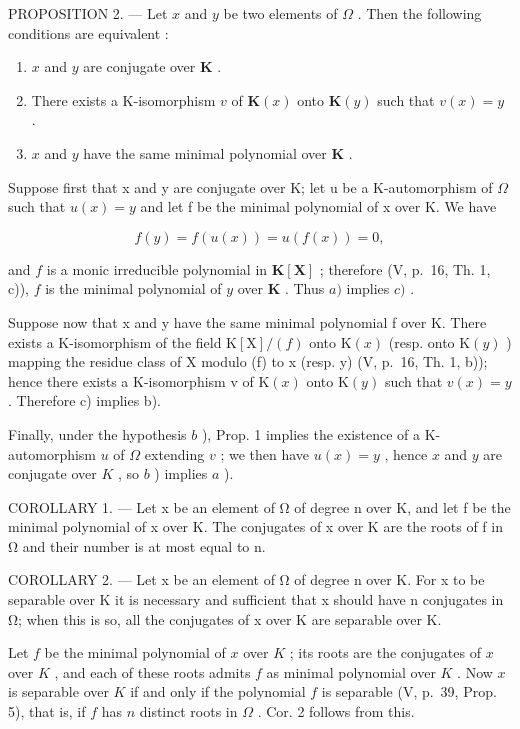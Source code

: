 PROPOSITION 2. --- Let \(x\) and \(y\) be two elements of \(\Omega\) . Then the following conditions are equivalent :

\begin{enumerate}
\def\labelenumi{\alph{enumi})}
\item
  \(x\) and \(y\) are conjugate over \(\mathbf{K}\) .
\item
  There exists a K-isomorphism \(v\) of \(\mathbf{K}(x)\) onto \(\mathbf{K}(y)\) such that \(v(x) = y\) .
\item
  \(x\) and \(y\) have the same minimal polynomial over \(\mathbf{K}\) .
\end{enumerate}

Suppose first that x and y are conjugate over K; let u be a K-automorphism of \(\Omega\) such that \(u(x) = y\) and let f be the minimal polynomial of x over K. We have

\[
f (y) = f (u (x)) = u (f (x)) = 0,
\]

and \(f\) is a monic irreducible polynomial in \(\mathbf{K}[\mathbf{X}]\) ; therefore (V, p.~16, Th. 1, c)), \(f\) is the minimal polynomial of \(y\) over \(\mathbf{K}\) . Thus \(a)\) implies \(c)\) .

Suppose now that x and y have the same minimal polynomial f over K. There exists a K-isomorphism of the field \(\mathrm{K}[\mathrm{X}]/(f)\) onto \(\mathrm{K}(x)\) (resp. onto \(\mathrm{K}(y)\) ) mapping the residue class of X modulo (f) to x (resp. y) (V, p.~16, Th. 1, b)); hence there exists a K-isomorphism v of \(\mathrm{K}(x)\) onto \(\mathrm{K}(y)\) such that \(v(x)=y\) . Therefore c) implies b).

Finally, under the hypothesis \(b\) ), Prop. 1 implies the existence of a K-automorphism \(u\) of \(\Omega\) extending \(v\) ; we then have \(u(x) = y\) , hence \(x\) and \(y\) are conjugate over \(K\) , so \(b\) ) implies \(a\) ).

COROLLARY 1. --- Let x be an element of Ω of degree n over K, and let f be the minimal polynomial of x over K. The conjugates of x over K are the roots of f in Ω and their number is at most equal to n.

COROLLARY 2. --- Let x be an element of Ω of degree n over K. For x to be separable over K it is necessary and sufficient that x should have n conjugates in Ω; when this is so, all the conjugates of x over K are separable over K.

Let \(f\) be the minimal polynomial of \(x\) over \(K\) ; its roots are the conjugates of \(x\) over \(K\) , and each of these roots admits \(f\) as minimal polynomial over \(K\) . Now \(x\) is separable over \(K\) if and only if the polynomial \(f\) is separable (V, p.~39, Prop. 5), that is, if \(f\) has \(n\) distinct roots in \(\Omega\) . Cor. 2 follows from this.

